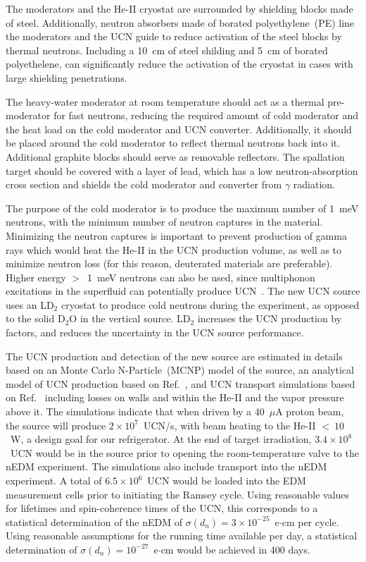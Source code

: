 The moderators and the He-II cryostat are surrounded by shielding blocks
made of steel. Additionally, neutron absorbers made of borated
polyethylene~(PE) line the moderators and the UCN guide to reduce
activation of the steel blocks by thermal neutrons. Including a 10~cm
of steel shilding and 5~cm of borated polyethelene, can significantly
reduce the activation of the cryostat in cases with large shielding
penetrations.

The heavy-water moderator at room temperature should act as a thermal
pre-moderator for fast neutrons, reducing the required amount of cold
moderator and the heat load on the cold moderator and UCN
converter. Additionally, it should be placed around the cold moderator
to reflect thermal neutrons back into it. Additional graphite blocks
should serve as removable reflectors. The spallation target should be
covered with a layer of lead, which has a low neutron-absorption cross
section and shields the cold moderator and converter from $\gamma$
radiation.

The purpose of the cold moderator is to produce the maximum number of
1~meV neutrons, with the minimum number of neutron captures in the
material. Minimizing the neutron captures is important to prevent
production of gamma rays which would heat the He-II in the UCN
production volume, as well as to minimize neutron loss (for this
reason, deuterated materials are preferable). Higher energy $>$~1~meV
neutrons can also be used, since multiphonon excitations in the
superfluid can potentially produce UCN~\cite{Schmidt2009,
  Korobkina2002}. The new UCN source uses an LD$_2$ cryostat to
produce cold neutrons during the experiment, as opposed to the solid
D$_2$O in the vertical source. LD$_2$ increases the UCN production by
factors, and reduces the uncertainty in the UCN source performance.



The UCN production and detection of the new source are estimated in
details based on an Monte Carlo N-Particle~(MCNP) model of the source,
an analytical model of UCN production based on
Ref.~\cite{Korobkina2002}, and UCN transport simulations based on
Ref.~\cite{schreyer2017pentrack} including losses on walls and within
the He-II and the vapor pressure above it.  The simulations indicate
that when driven by a 40~$\mu$A proton beam, the source will produce
$2\times 10^7$~UCN/s, with beam heating to the He-II $<~10$~W, a
design goal for our refrigerator. At the end of target irradiation,
$3.4\times 10^8$~UCN would be in the source prior to opening the
room-temperature valve to the nEDM experiment.  The simulations also
include transport into the nEDM experiment. A total of
$6.5 \times 10^6$~UCN would be loaded into the EDM measurement cells
prior to initiating the Ramsey cycle. Using reasonable values for
lifetimes and spin-coherence times of the UCN, this corresponds to a
statistical determination of the nEDM of
$\sigma(d_n) = 3\times 10^{-25}$~e$\cdot$cm per cycle. Using
reasonable assumptions for the running time available per day, a
statistical determination of $\sigma(d_n) = 10^{-27}$~e$\cdot$cm would
be achieved in 400 days.

